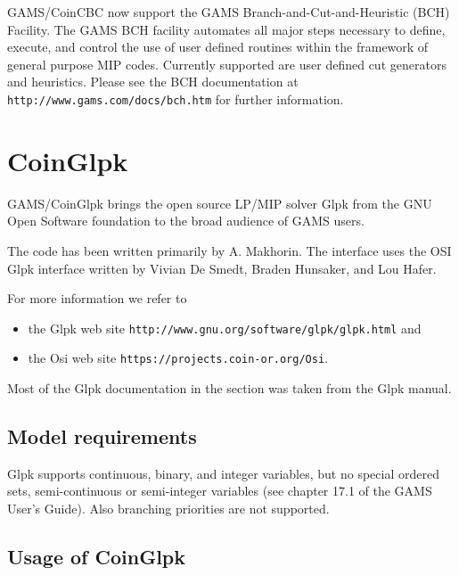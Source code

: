 GAMS/CoinCBC now support the GAMS Branch-and-Cut-and-Heuristic (BCH) Facility.
The GAMS BCH facility automates all major steps necessary to define, execute, and control the use of user defined routines within the framework of general purpose MIP codes.
Currently supported are user defined cut generators and heuristics.
Please see the BCH documentation at \texttt{http://www.gams.com/docs/bch.htm} for further information.







\section{CoinGlpk}

GAMS/CoinGlpk brings the open source LP/MIP solver Glpk from the GNU Open Software foundation to the broad audience of GAMS users.

The code has been written primarily by A. Makhorin.
The interface uses the OSI Glpk interface written by Vivian De Smedt, Braden Hunsaker, and Lou Hafer.

For more information we refer to
\begin{itemize}
\item the Glpk web site \texttt{http://www.gnu.org/software/glpk/glpk.html} and
\item the Osi web site \texttt{https://projects.coin-or.org/Osi}.
\end{itemize}
Most of the Glpk documentation in the section was taken from the Glpk manual.

\subsection{Model requirements}

Glpk supports continuous, binary, and integer variables, but no special ordered sets, semi-continuous or semi-integer variables (see chapter 17.1 of the GAMS User's Guide).
Also branching priorities are not supported.

\subsection{Usage of CoinGlpk}

